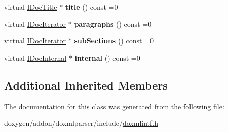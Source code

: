 \begin{DoxyCompactItemize}
virtual \mbox{\hyperlink{class_i_doc_title}{I\+Doc\+Title}} $\ast$ {\bfseries title} () const =0
\item 
\mbox{\label{class_i_doc_section_a728acdcea61144ff470933760497527b}} 
virtual \mbox{\hyperlink{class_i_doc_iterator}{I\+Doc\+Iterator}} $\ast$ {\bfseries paragraphs} () const =0
\item 
\mbox{\label{class_i_doc_section_ade9bbb77b197b214c04864984fa7e50c}} 
virtual \mbox{\hyperlink{class_i_doc_iterator}{I\+Doc\+Iterator}} $\ast$ {\bfseries sub\+Sections} () const =0
\item 
\mbox{\label{class_i_doc_section_a89ab5759d6d9af151ab7185f42404051}} 
virtual \mbox{\hyperlink{class_i_doc_internal}{I\+Doc\+Internal}} $\ast$ {\bfseries internal} () const =0
\end{DoxyCompactItemize}
\subsection*{Additional Inherited Members}


The documentation for this class was generated from the following file\+:\begin{DoxyCompactItemize}
\item 
doxygen/addon/doxmlparser/include/\mbox{\hyperlink{include_2doxmlintf_8h}{doxmlintf.\+h}}\end{DoxyCompactItemize}
